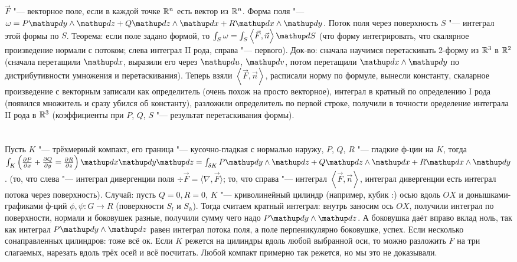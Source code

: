 \section{} %
$\vec F$ "--- векторное поле, если в каждой точке $\mathbb{R}^n$ есть вектор из $\mathbb{R}^n$.
Форма поля "--- $\omega = P\d y \wedge \d z + Q\d z \wedge \d x + R\d x \wedge \d y$.
Поток поля через поверхность $S$ "--- интеграл этой формы по $S$.
Теорема: если поле задано формой, то $\int_S \omega = \int_S \left<\vec F, \vec n\right> \d S$ (что форму интегрировать, что скалярное произведение нормали с потоком;
слева интеграл II рода, справа "--- первого).
Док-во: сначала научимся перетаскивать 2-форму из $\mathbb{R}^3$ в $\mathbb{R}^2$ (сначала перетащили $\d x$, выразили его через $\d u$, $\d v$,
потом перетащили $\d x \wedge \d y$ по дистрибутивности умножения и перетаскивания).
Теперь взяли $\left<\vec F, \vec n\right>$, расписали норму по формуле, вынесли константу, скаларное произведение с векторным записали как определитель
(очень похож на просто векторное), интеграл в кратный по определению I рода (появился множитель и сразу убился об константу), разложили
определитель по первой строке, получили в точности оределение интеграла II рода в $\mathbb{R}^3$ (коэффициенты при $P$, $Q$, $S$ "--- результат перетаскивания формы).

\section{} %
Пусть $K$ "--- трёхмерный компакт, его граница "--- кусочно-гладкая с нормалью наружу, $P$, $Q$, $R$ "--- гладкие ф-ции на $K$,
тогда $\int_K \left( \partd{P}{x} + \partd{Q}{y} = \partd{R}{z} \right)\d x\d y\d z = \int_{\delta K} P\d y \wedge \d z + Q\d z \wedge \d x + R\d x \wedge \d y$.
(то, что слева "--- интеграл дивергенции поля $\div \vec F = \langle\nabla, \vec F\rangle$; то, что справа "--- интеграл $\left< \vec F, \vec n \right>$,
интеграл дивергенции есть интеграл потока через поверхность).
Случай: пусть $Q=0,R=0$, $K$ "--- криволинейный цилиндр (например, кубик :) осью вдоль $OX$ и донышками-графиками ф-ций $\phi, \psi \colon G \to R$ (поверхности $S_l$ и $S_h$).
Тогда считаем кратный интеграл: внутрь заносим ось $OX$, получили интеграл по поверхности, нормали и боковушек разные, получили сумму чего надо $P\d y \wedge \d z$.
А боковушка даёт вправо вклад ноль, так как интеграл $P \d y \wedge \d z$ равен интеграл потока поля, а поле перпеникулярно боковушке, успех.
Если несколько сонаправленных цилиндров: тоже всё ок.
Если $K$ режется на цилиндры вдоль любой выбранной оси, то можно разложить $F$ на три слагаемых, нарезать вдоль трёх осей и всё посчитать.
Любой компакт примерно так режется, но мы это не доказывали.

